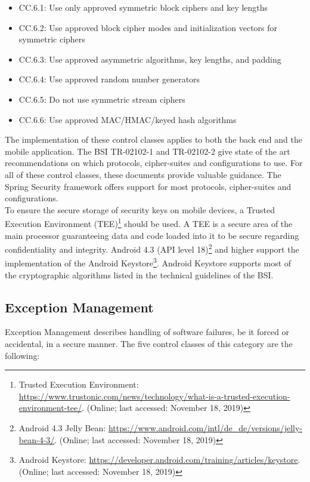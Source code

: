 \begin{itemize}
    \item CC.6.1: Use only approved symmetric block ciphers and key lengths
    \item CC.6.2: Use approved block cipher modes and initialization vectors for symmetric ciphers
    \item CC.6.3: Use approved asymmetric algorithms, key lengths, and padding
    \item CC.6.4: Use approved random number generators
    \item CC.6.5: Do not use symmetric stream ciphers
    \item CC.6.6: Use approved MAC/HMAC/keyed hash algorithms
\end{itemize}

The implementation of these control classes applies to both the back end and the mobile application. The BSI TR-02102-1 and TR-02102-2 give state of the art recommendations on which protocols, cipher-suites and configurations to use. For all of these control classes, these documents provide valuable guidance. The Spring Security framework offers support for most protocols, cipher-suites and configurations.\\
\newline
To ensure the secure storage of security keys on mobile devices, a Trusted Execution Environment (TEE)\footnote{Trusted Execution Environment: \url{https://www.trustonic.com/news/technology/what-is-a-trusted-execution-environment-tee/}. (Online; last accessed:  November 18, 2019)} should be used. A TEE is a secure area of the main processor guaranteeing data and code loaded into it to be secure regarding confidentiality and integrity. Android 4.3 (API level 18)\footnote{Android 4.3 Jelly Bean: \url{https://www.android.com/intl/de_de/versions/jelly-bean-4-3/}. (Online; last accessed:  November 18, 2019)} and higher support the implementation of the Android Keystore\footnote{Android Keystore: \url{https://developer.android.com/training/articles/keystore}. (Online; last accessed:  November 18, 2019)}. Android Keystore supports most of the cryptographic algorithms listed in the technical guidelines of the BSI.

\subsection{Exception Management}
Exception Management describes handling of software failures, be it forced or accidental, in a secure manner. The five control classes of this category are the following:

